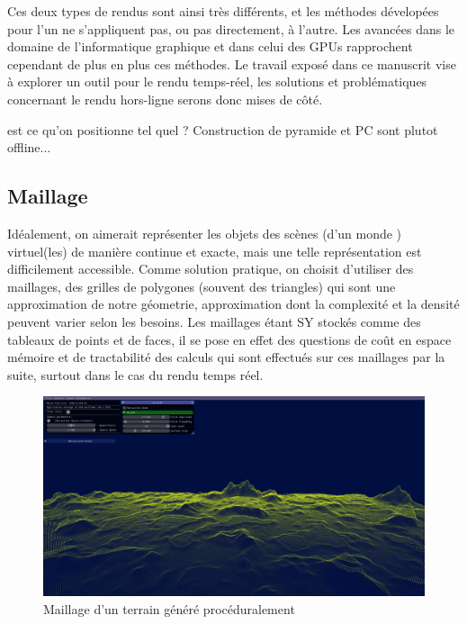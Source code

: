 \bigskip

Ces deux types de rendus sont ainsi très différents, et les méthodes dévelopées pour l'un ne s'appliquent pas, ou pas directement, à l'autre. Les avancées dans le domaine de l'informatique graphique et dans celui des GPUs rapprochent cependant de plus en plus ces méthodes. Le travail exposé dans ce manuscrit vise à explorer un outil pour le rendu temps-réel, les solutions et problématiques concernant le rendu hors-ligne serons donc mises de côté.

{\color{red}est ce qu'on positionne tel quel ? Construction de pyramide et PC sont plutot offline...}

\subsection*{Maillage}

Idéalement, on aimerait représenter les objets des scènes (d'un monde ) virtuel(les) de manière continue et exacte, mais une telle représentation est difficilement accessible. Comme solution pratique, on choisit d'utiliser des maillages, des grilles de polygones (souvent des triangles) qui sont une approximation de notre géometrie, approximation dont la complexité et la densité peuvent varier selon les besoins. Les maillages étant SY stockés comme des tableaux de points et de faces, il se pose en effet des questions de coût en espace mémoire et de tractabilité des calculs qui sont effectués sur ces maillages par la suite, surtout dans le cas du rendu temps réel.

\begin{figure}[h!]
    \centering
    \includegraphics[width=\textwidth]{contenu/resources/images/full_terrain}
    \caption{Maillage d'un terrain généré procéduralement}
    \label{fig:procedural-mesh}
\end{figure}

